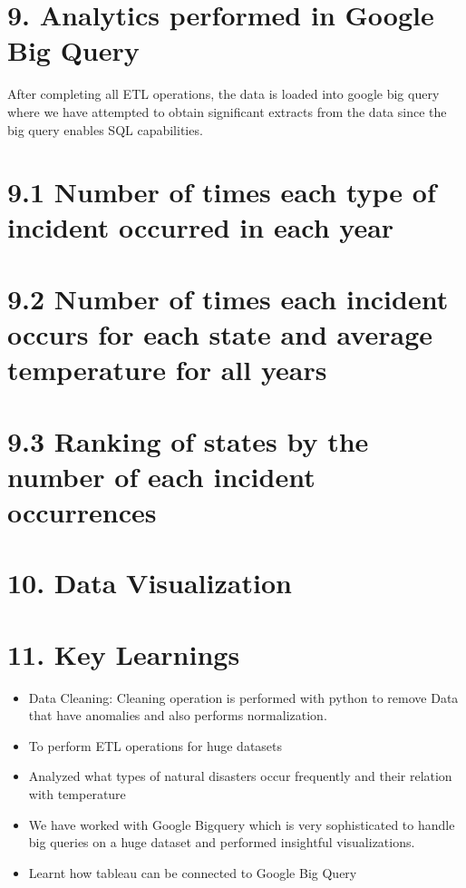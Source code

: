 \documentclass[10pt,twocolumn,letterpaper]{article}
\begin{document}
 \section{9. Analytics performed in Google Big Query}
 After completing all ETL operations, the data is loaded into google big query where we have attempted to obtain significant extracts from the data since the big query enables SQL capabilities.
 \section{9.1 Number of times each type of incident occurred in each year}
 \section{9.2 Number of times each incident occurs for each state and average temperature for all years}
 \section{9.3  Ranking of states by the number of each incident occurrences}
\section{10. Data Visualization}
\section{11. Key Learnings}
\begin{itemize}
	\item   Data Cleaning: Cleaning operation is performed with python to remove Data that have anomalies and also performs normalization.
	\item  To perform ETL operations for huge datasets
	\item  Analyzed what types of natural disasters occur frequently and their relation with temperature
        \item We have worked with Google Bigquery which is very sophisticated to handle big queries on a huge dataset and performed insightful visualizations.
        \item Learnt how tableau can be connected to Google Big Query
\end{itemize}   
\end{document}
